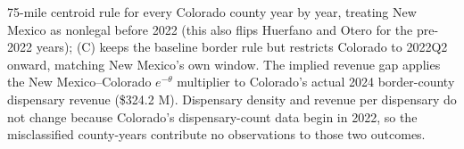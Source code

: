 \begin{table}[htbp]
\begin{minipage}{0.95\textwidth}
75-mile centroid rule for every Colorado county year by year, treating New Mexico as nonlegal before 2022
(this also flips Huerfano and Otero for the pre-2022 years); (C) keeps the baseline border rule but
restricts Colorado to 2022Q2 onward, matching New Mexico's own window. The implied revenue gap applies the
New Mexico--Colorado $e^{-\theta}$ multiplier to Colorado's actual 2024 border-county dispensary revenue
(\$324.2 M). Dispensary density and revenue per dispensary do not change because Colorado's dispensary-count
data begin in 2022, so the misclassified county-years contribute no observations to those two outcomes.
\end{minipage}
\end{table}
